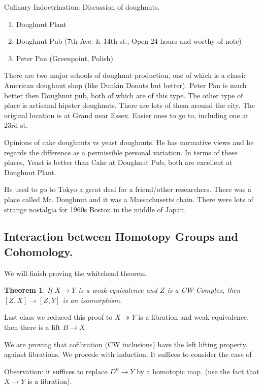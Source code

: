 \documentclass[12pt]{article}
\newtheorem{theorem}{Theorem}[section]
\theoremstyle{definition}
\begin{document}
Culinary Indoctrination:
Discussion of doughnuts. 
\begin{enumerate}
	\item Doughnut Plant
	\item Doughnut Pub (7th Ave. \& 14th st., Open 24 hours and worthy of note)
	\item Peter Pan (Greenpoint, Polish)
\end{enumerate}
There are two major schools of doughnut production, one of which is a classic American doughnut shop (like Dunkin Donuts but better). Peter Pan is much better then Doughnut pub, both of which are of this type. The other type of place is artisanal hipster doughnuts. There are lots of them around the city. The original location is at Grand near Essex. Easier ones to go to, including one at 23rd st.

Opinions of cake doughnuts vs yeast doughnuts. He has normative views and he regards the difference as a permissible personal variation. In terms of these places, Yeast is better than Cake at Doughnut Pub, both are excellent at Doughnut Plant.

He used to go to Tokyo a great deal for a friend/other researchers. There was a place called Mr. Doughnut and it was a Massachusetts chain. There were lots of strange nostalgia for 1960s Boston in the middle of Japan. 

\subsection{Interaction between Homotopy Groups and Cohomology.}
We will finish proving the whitehead theorem. 
\begin{theorem}
	If $X\to Y$ is a weak equivalence and $Z$ is a CW-Complex, then $[Z,X]\to [Z,Y]$ is an isomorphism. 
\end{theorem}
Last class we reduced this proof to $X\twoheadrightarrow Y$ is a fibration and weak equivalence, then there is a lift $B\to X$. \begin{center}
\end{center}
We are proving that cofibration (CW inclusions) have the left lifting property. against fibrations. We procede with induction. It suffices to consider the case of \begin{center}
\end{center}
Observation: it suffices to replace $D^n\to Y$ by a homotopic map.  (use the fact that $X\to Y$ is a fibration). 
\end{document}
